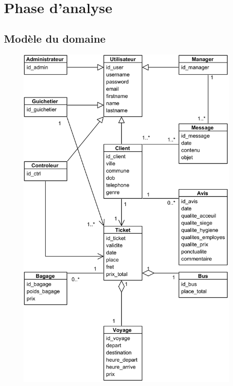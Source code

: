 \section[Phase d’analyse]{Phase d’analyse}
    \subsection[Modèle du domaine]{Modèle du domaine}
        \begin{figure}[H]
            \centering
            \includegraphics[width=130mm]{images/modele-du-domaine/Modele du domaine Class Diagram.png}
            \label{fig:mdSysteme}
        \end{figure}
